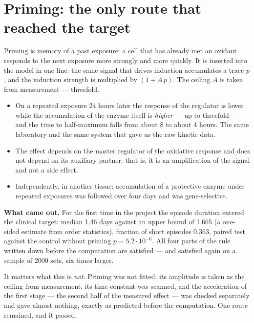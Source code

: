 \section{Priming: the only route that reached the target}\label{sec:prime}
Priming is memory of a past exposure: a cell that has already met an oxidant responds to the next exposure more strongly and more quickly. It is inserted into the model in one line: the same signal that drives induction accumulates a trace $p$, and the induction strength is multiplied by $(1+A\,p)$. The ceiling $A$ is taken from measurement --- threefold.

\facts
\begin{itemize}
\item On a repeated exposure 24 hours later the response of the regulator is lower while the accumulation of the enzyme itself is \emph{higher} --- up to threefold --- and the time to half-maximum falls from about 8 to about 4 hours. The same laboratory and the same system that gave us the raw kinetic data.\tS
\item The effect depends on the master regulator of the oxidative response and does not depend on its auxiliary partner: that is, it is an amplification of the signal and not a side effect.\tS
\item Independently, in another tissue: accumulation of a protective enzyme under repeated exposures was followed over four days and was gene-selective.\tP
\end{itemize}

\textbf{What came out.} For the first time in the project the episode duration entered the clinical target: median 1.46 days against an upper bound of 1.665 (a one-sided estimate from order statistics), fraction of short episodes 0.363, paired test against the control without priming $p=5.2\cdot10^{-6}$. All four parts of the rule written down before the computation are satisfied --- and satisfied again on a sample of 2000 sets, six times larger.

It matters what this is \emph{not}. Priming was not fitted: its amplitude is taken as the ceiling from measurement, its time constant was scanned, and the acceleration of the first stage --- the second half of the measured effect --- was checked separately and gave almost nothing, exactly as predicted before the computation. One route remained, and it passed.
